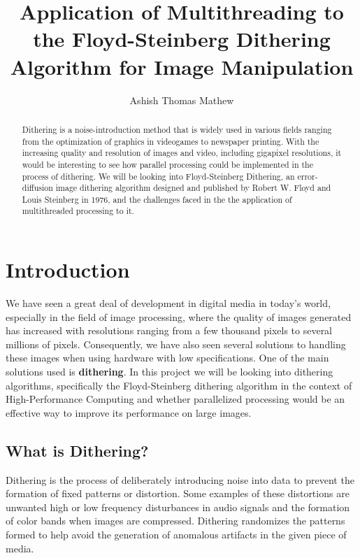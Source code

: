 \documentclass{article}
\title{Application of Multithreading to the Floyd-Steinberg Dithering Algorithm for Image Manipulation}
\author{Ashish Thomas Mathew}
\date{}
\begin{document}
\maketitle
\begin{abstract}
    \noindent Dithering is a noise-introduction method that is widely used in various fields ranging from the optimization of graphics in videogames to newspaper printing. With the increasing quality and resolution of images and video, including gigapixel resolutions, it would be interesting to see how parallel processing could be implemented in the process of dithering. We will be looking into Floyd-Steinberg Dithering, an error-diffusion image dithering algorithm designed and published by Robert W. Floyd and Louis Steinberg in 1976, and the challenges faced in the the application of multithreaded processing to it.  
\end{abstract}

\section{Introduction}\label{Introduction}

We have seen a great deal of development in digital media in today's world, especially in the field of image processing, where the quality of images generated has increased with resolutions ranging from a few thousand pixels to several millions of pixels. Consequently, we have also seen several solutions to handling these images when using hardware with low specifications. One of the main solutions used is \textbf{dithering}. In this project we will be looking into dithering algorithms, specifically the Floyd-Steinberg dithering algorithm\cite{Steinberg} in the context of High-Performance Computing and whether parallelized processing would be an effective way to improve its performance on large images.

\subsection{What is Dithering?}\label{Dithering Intro}

Dithering is the process of deliberately introducing noise into data to prevent the formation of fixed patterns or distortion. Some examples of these distortions are unwanted high or low frequency disturbances in audio signals and the formation of color bands when images are compressed. Dithering randomizes the patterns formed to help avoid the generation of anomalous artifacts in the given piece of media.
\end{document}
